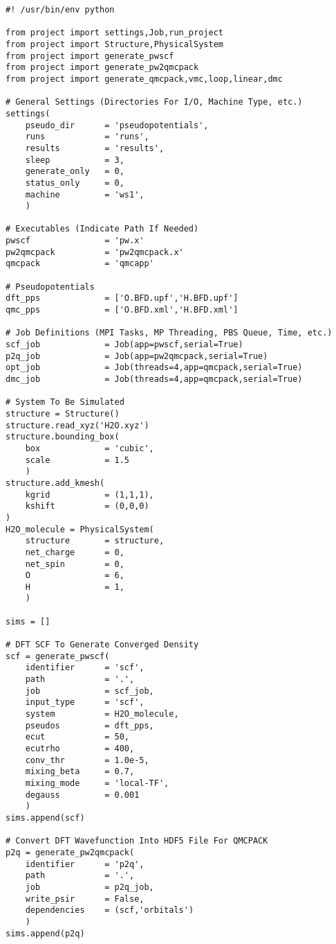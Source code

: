 \begin{lstlisting}[caption=Nexus example for H$_2$O using Quantum ESPRESSO orbitals and BFD pseudopotentials]
#! /usr/bin/env python

from project import settings,Job,run_project
from project import Structure,PhysicalSystem
from project import generate_pwscf
from project import generate_pw2qmcpack
from project import generate_qmcpack,vmc,loop,linear,dmc

# General Settings (Directories For I/O, Machine Type, etc.)
settings(
    pseudo_dir      = 'pseudopotentials',
    runs            = 'runs',
    results         = 'results',
    sleep           = 3,
    generate_only   = 0,
    status_only     = 0,
    machine         = 'ws1',
    )

# Executables (Indicate Path If Needed)
pwscf               = 'pw.x'
pw2qmcpack          = 'pw2qmcpack.x'
qmcpack             = 'qmcapp'

# Pseudopotentials
dft_pps             = ['O.BFD.upf','H.BFD.upf']
qmc_pps             = ['O.BFD.xml','H.BFD.xml']

# Job Definitions (MPI Tasks, MP Threading, PBS Queue, Time, etc.)
scf_job             = Job(app=pwscf,serial=True)
p2q_job             = Job(app=pw2qmcpack,serial=True)
opt_job             = Job(threads=4,app=qmcpack,serial=True)
dmc_job             = Job(threads=4,app=qmcpack,serial=True)

# System To Be Simulated
structure = Structure()
structure.read_xyz('H2O.xyz')
structure.bounding_box(
    box             = 'cubic',
    scale           = 1.5
    )
structure.add_kmesh(
    kgrid           = (1,1,1),
    kshift          = (0,0,0)
)
H2O_molecule = PhysicalSystem(
    structure       = structure,
    net_charge      = 0,
    net_spin        = 0,
    O               = 6,
    H               = 1,
    )

sims = []

# DFT SCF To Generate Converged Density
scf = generate_pwscf(
    identifier      = 'scf',
    path            = '.',
    job             = scf_job,
    input_type      = 'scf',
    system          = H2O_molecule,
    pseudos         = dft_pps,
    ecut            = 50,
    ecutrho         = 400,
    conv_thr        = 1.0e-5,
    mixing_beta     = 0.7,
    mixing_mode     = 'local-TF',
    degauss         = 0.001
    )
sims.append(scf)

# Convert DFT Wavefunction Into HDF5 File For QMCPACK
p2q = generate_pw2qmcpack(
    identifier      = 'p2q',
    path            = '.',
    job             = p2q_job,
    write_psir      = False,
    dependencies    = (scf,'orbitals')
    )
sims.append(p2q)


\end{lstlisting}
